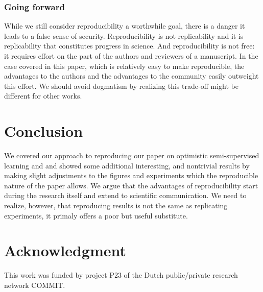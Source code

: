 \documentclass[runningheads,a4paper]{llncs}\usepackage[]{graphicx}\usepackage[]{color}
\begin{document}
\subsubsection{Going forward}
While we still consider reproducibility a worthwhile goal, there is a danger it leads to a false sense of security. Reproducibility is not replicability and it is replicability that constitutes progress in science. And reproducibility is not free: it requires effort on the part of the authors and reviewers of a manuscript. In the case covered in this paper, which is relatively easy to make reproducible, the advantages to the authors and the advantages to the community easily outweight this effort. We should avoid dogmatism by realizing this trade-off might be different for other works.

\section{Conclusion}
We covered our approach to reproducing our paper on optimistic semi-supervised learning and and showed some additional interesting, and nontrivial results by making slight adjustments to the figures and experiments which the reproducible nature of the paper allows. We argue that the advantages of reproducibility start during the research itself and extend to scientific communication. We need to realize, however, that reproducing results is not the same as replicating experiments, it primaly offers a poor but useful substitute.

\section*{Acknowledgment}
This work was funded by project P23 of the Dutch public/private research network COMMIT.



\end{document}
